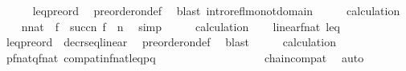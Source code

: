 \begin{isabellebody}
\ \ \ \ \isamarkupfalse%
\ leq{\isacharunderscore}{\kern0pt}preord\ \isamarkupfalse%
\ preorder{\isacharunderscore}{\kern0pt}on{\isacharunderscore}{\kern0pt}def\ \isamarkupfalse%
\ {\isacharparenleft}{\kern0pt}blast\ intro{\isacharcolon}{\kern0pt}refl{\isacharunderscore}{\kern0pt}monot{\isacharunderscore}{\kern0pt}domain{\isacharparenright}{\kern0pt}\isanewline
\ \ \isamarkupfalse%
\ \isamarkupfalse%
\ calculation\ \isanewline
\ \ \isamarkupfalse%
\ {\isachardoublequoteopen}{\isasymforall}n{\isasymin}nat{\isachardot}{\kern0pt}\ \ f\ {\isacharbackquote}{\kern0pt}\ succ{\isacharparenleft}{\kern0pt}n{\isacharparenright}{\kern0pt}{\isasympreceq}\ f\ {\isacharbackquote}{\kern0pt}\ n{\isachardoublequoteclose}\ \isamarkupfalse%
\ {\isacharparenleft}{\kern0pt}simp{\isacharparenright}{\kern0pt}\isanewline
\ \ \isamarkupfalse%
\ \isamarkupfalse%
\ calculation\isanewline
\ \ \isamarkupfalse%
\ {\isachardoublequoteopen}linear{\isacharparenleft}{\kern0pt}f{\isacharbackquote}{\kern0pt}{\isacharbackquote}{\kern0pt}nat{\isacharcomma}{\kern0pt}\ leq{\isacharparenright}{\kern0pt}{\isachardoublequoteclose}\isanewline
\ \ \ \ \isamarkupfalse%
\ leq{\isacharunderscore}{\kern0pt}preord\ \ decr{\isacharunderscore}{\kern0pt}seq{\isacharunderscore}{\kern0pt}linear\ \isamarkupfalse%
\ preorder{\isacharunderscore}{\kern0pt}on{\isacharunderscore}{\kern0pt}def\ \isamarkupfalse%
\ {\isacharparenleft}{\kern0pt}blast{\isacharparenright}{\kern0pt}\isanewline
\ \ \isamarkupfalse%
\ \isamarkupfalse%
\ calculation\isanewline
\ \ \isamarkupfalse%
\ {\isachardoublequoteopen}{\isacharparenleft}{\kern0pt}{\isasymforall}p{\isasymin}f{\isacharbackquote}{\kern0pt}{\isacharbackquote}{\kern0pt}nat{\isachardot}{\kern0pt}{\isasymforall}q{\isasymin}f{\isacharbackquote}{\kern0pt}{\isacharbackquote}{\kern0pt}nat{\isachardot}{\kern0pt}\ compat{\isacharunderscore}{\kern0pt}in{\isacharparenleft}{\kern0pt}f{\isacharbackquote}{\kern0pt}{\isacharbackquote}{\kern0pt}nat{\isacharcomma}{\kern0pt}leq{\isacharcomma}{\kern0pt}p{\isacharcomma}{\kern0pt}q{\isacharparenright}{\kern0pt}{\isacharparenright}{\kern0pt}{\isachardoublequoteclose}\ \ \ \ \ \ \ \ \ \ \ \ \ \isanewline
\ \ \ \ \isamarkupfalse%
\ chain{\isacharunderscore}{\kern0pt}compat\ \isamarkupfalse%
\ {\isacharparenleft}{\kern0pt}auto{\isacharparenright}{\kern0pt}\isanewline

\end{isabellebody}
